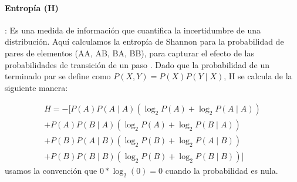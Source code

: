 
\paragraph{Entropía (H)}: Es una medida de información que cuantifica la incertidumbre de una distribución. Aquí calculamos la entropía de Shannon para la probabilidad de pares de elementos (AA, AB, BA, BB), para capturar el efecto de las probabilidades de transición de un paso \cite{f85}. Dado que la probabilidad de un terminado par se define como $P(X,Y) = P(X) P(Y \mid  X)$, H se calcula de la siguiente manera:

\begin{align*}
H = - [ 
         P(A) P(A \mid A) ( \log_2 P(A) + \log_2 P(A\mid A) ) \\
        +P(A) P(B \mid A) ( \log_2 P(A) + \log_2 P(B\mid A) )  \\
        +P(B) P(A \mid B) ( \log_2 P(B) + \log_2 P(A\mid B) ) \\
        +P(B) P(B \mid B) ( \log_2 P(B) + \log_2 P(B\mid B) ) 
         ] 
\end{align*}
usamos la convención que $0 * \log_2(0) = 0$ cuando la probabilidad es nula.



